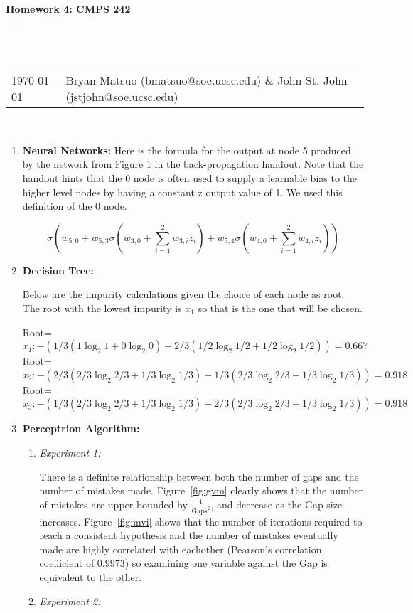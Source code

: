 \documentclass[12pt]{article}
\renewcommand{\title}[1]{\textbf{#1}\\}
\renewcommand{\line}{\begin{tabularx}{\textwidth}{X>{\raggedleft}X}\hline\\\end{tabularx}\\[-0.5cm]}
\newcommand{\leftright}[2]{\begin{tabularx}{\textwidth}{X>{\raggedleft}X}#1%
& #2\\\end{tabularx}\\[-0.5cm]}
\begin{document}
\title{Homework 4: CMPS 242}
\line
\leftright{\today}{Bryan Matsuo (bmatsuo@soe.ucsc.edu) \& John St. John (jstjohn@soe.ucsc.edu)} %
\begin{enumerate}
\item \textbf{Neural Networks:}
Here is the formula for the output at node 5 produced by the network from Figure 1 in the back-propagation handout. Note that the handout hints that the 0 node is often used to supply a learnable bias to the higher level nodes by having a constant z output value of 1. We used this definition of the 0 node.

\[
\sigma\left(w_{5,0}+w_{5,3}\sigma\left(w_{3,0}+\sum_{i=1}^2w_{3,i}z_i\right)+w_{5,4}\sigma\left(w_{4,0}+\sum_{i=1}^2w_{4,i}z_i\right) \right)
\]

\item \textbf{Decision Tree:}

Below are the impurity calculations given the choice of each node as root. The root with the lowest impurity is $x_1$ so that is the one that will be chosen.

Root=\[x_1: -\left(1/3\left(1\log_2 1 + 0\log_2 0 \right)+ 2/3 \left( 1/2\log_2 1/2 + 1/2\log_2 1/2\right)\right) = 0.667\]
Root=\[x_2: -\left(2/3\left( 2/3\log_2 2/3 + 1/3\log_2 1/3 \right) + 1/3 \left( 2/3\log_2 2/3 + 1/3\log_2 1/3 \right) \right)= 0.918 \]
Root=\[x_3: -\left(1/3\left( 2/3\log_2 2/3 + 1/3\log_2 1/3\right) + 2/3 \left( 2/3\log_2 2/3 + 1/3\log_2 1/3 \right)\right) =  0.918 \]


\item \textbf{Perceptrion Algorithm:}

\begin{enumerate}
\item \textit{Experiment 1:}

There is a definite relationship between both the number of gaps and the number of mistakes made. Figure~\ref{fig:gvm} clearly shows that the number of mistakes are upper bounded by $\frac{1}{\text{Gaps}^2}$, and decrease as the Gap size increases. Figure~\ref{fig:mvi} shows that the number of iterations required to reach a consistent hypothesis and the number of mistakes eventually made are highly correlated with eachother (Pearson's correlation coefficient of $0.9973$) so examining one variable against the Gap is equivalent to the other.



\item \textit{Experiment 2:}


\end{enumerate}
\end{enumerate}
\end{document}
